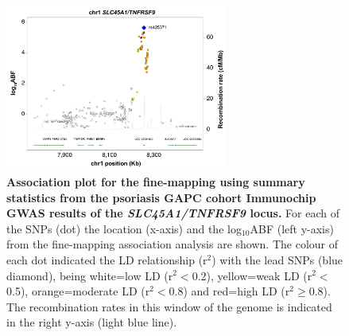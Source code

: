 \begin{figure}[htbp]
\centering
\includegraphics[width=0.65\textwidth]{./Results2/pdfs/PS_FM_Immunochip_TNFSRF9_association_plot}
\caption[Association plot for the fine-mapping using summary statistics from the psoriasis GAPC cohort Immunochip GWAS results of the \textit{SLC45A1/TNFRSF9} locus.]{\textbf{Association plot for the fine-mapping using summary statistics from the psoriasis GAPC cohort Immunochip GWAS results of the \textit{SLC45A1/TNFRSF9} locus.} For each of the SNPs (dot) the location (x-axis) and the log$_{10}$ABF (left y-axis) from the fine-mapping association analysis are shown. The colour of each dot indicated the LD relationship (r$^2$) with the lead SNPs (blue diamond), being white=low LD (r$^{2}<$0.2), yellow=weak LD (r$^{2}<$0.5), orange=moderate LD (r$^{2}<$0.8) and red=high LD (r$^{2}$$\geq$0.8). The recombination rates in this window of the genome is indicated in the right y-axis (light blue line).}
\label{figure:TNFRSF9_fine_mapping_association_plot}
\end{figure}





